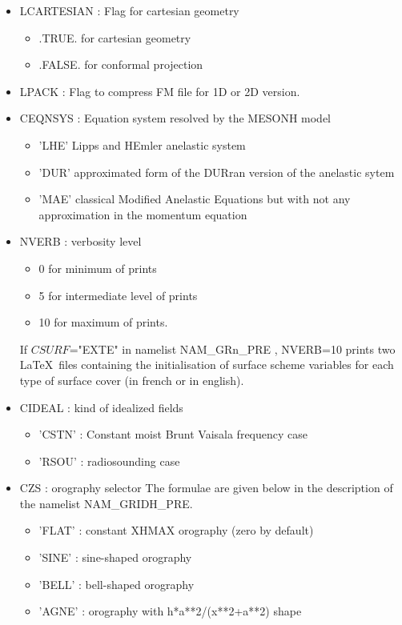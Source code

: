 \begin{itemize}

\item  LCARTESIAN 
: Flag for cartesian geometry 
\begin{itemize}
\item .TRUE. for cartesian geometry
\item .FALSE. for conformal projection
\end{itemize}

\item LPACK : Flag to compress FM file
for 1D or 2D version.

\item CEQNSYS : Equation system 
resolved by the MESONH model
\begin{itemize}
\item 'LHE' Lipps and HEmler anelastic system
\item 'DUR' approximated form of the DURran version of the anelastic sytem
\item 'MAE' classical Modified Anelastic Equations but with not any approximation 
in the momentum equation
\end{itemize}

\item  NVERB  : verbosity level
\begin{itemize}
\item  0 for minimum of prints
\item  5 for intermediate level of prints
\item  10 for maximum of prints.
\end{itemize}
If $CSURF$="EXTE" in
namelist NAM\_GRn\_PRE  , NVERB=10
prints two \LaTeX \ files containing the initialisation of
surface scheme variables for each type of surface cover
(in french or in english).

\item CIDEAL  : kind of idealized fields 
\begin{itemize}
\item 'CSTN' : Constant moist Brunt Vaisala frequency case 
\item 'RSOU' : radiosounding case
\end{itemize}


\item CZS   :  orography selector 
The formulae are given below in the description of the namelist  
NAM\_GRIDH\_PRE.
\begin{itemize}
\item 'FLAT' : constant XHMAX orography (zero by default)
\item 'SINE' : sine-shaped orography 
\item 'BELL' : bell-shaped orography
\item 'AGNE' : 	orography with h*a**2/(x**2+a**2) shape


\end{itemize}
\end{itemize}
